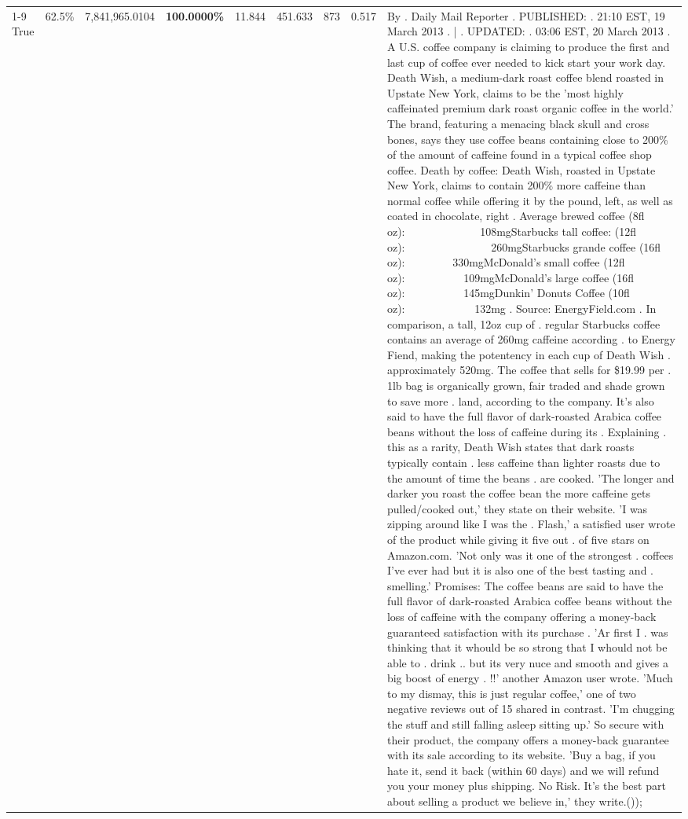 \begin{table}[H]
{\begin{tabular}{lllrlllll}
\cline{1-9}
True & 62.5\% & 7,841,965.0104 & \bfseries \color{red} 100.0000\% & 11.844 & 451.633 & 873 & 0.517 & By . Daily Mail Reporter . PUBLISHED: . 21:10 EST, 19 March 2013 . | . UPDATED: . 03:06 EST, 20 March 2013 . A U.S. coffee company is claiming to produce the first and last cup of coffee ever needed to kick start your work day. Death Wish, a medium-dark roast coffee blend roasted in Upstate New York, claims to be the 'most highly caffeinated premium dark roast organic coffee in the world.' The brand, featuring a menacing black skull and cross bones, says they use coffee beans containing close to 200\% of the amount of caffeine found in a typical coffee shop coffee. Death by coffee: Death Wish, roasted in Upstate New York, claims to contain 200\% more caffeine than normal coffee while offering it by the pound, left, as well as coated in chocolate, right . Average brewed coffee (8fl oz):              108mgStarbucks tall coffee: (12fl oz):                260mgStarbucks grande coffee (16fl oz):         330mgMcDonald's small coffee (12fl oz):           109mgMcDonald's large coffee (16fl oz):           145mgDunkin' Donuts Coffee (10fl oz):             132mg . Source: EnergyField.com . In comparison, a tall, 12oz cup of . regular Starbucks coffee contains an average of 260mg caffeine according . to Energy Fiend, making the potentency in each cup of Death Wish . approximately 520mg. The coffee that sells for \$19.99 per . 1lb bag is organically grown, fair traded and shade grown to save more . land, according to the company. It's also said to have the full flavor of dark-roasted Arabica coffee beans without the loss of caffeine during its . Explaining . this as a rarity, Death Wish states that dark roasts typically contain . less caffeine than lighter roasts due to the amount of time the beans . are cooked. 'The longer and darker you roast the coffee bean the more caffeine gets pulled/cooked out,' they state on their website. 'I was zipping around like I was the . Flash,' a satisfied user wrote of the product while giving it five out . of five stars on Amazon.com. 'Not only was it one of the strongest . coffees I've ever had but it is also one of the best tasting and . smelling.’ Promises: The coffee beans are said to have the full flavor of dark-roasted Arabica coffee beans without the loss of caffeine with the company offering a money-back guaranteed satisfaction with its purchase . 'Ar first I . was thinking that it whould be so strong that I whould not be able to . drink .. but its very nuce and smooth and gives a big boost of energy . !!' another Amazon user wrote. 'Much to my dismay, this is just regular coffee,' one of two negative reviews out of 15 shared in contrast. 'I'm chugging the stuff and still falling asleep sitting up.' So secure with their product, the company offers a money-back guarantee with its sale according to its website. 'Buy a bag, if you hate it, send it back (within 60 days) and we will refund you your money plus shipping. No Risk. It’s the best part about selling a product we believe in,' they write.()); \\

\end{tabular}}
\end{table}
